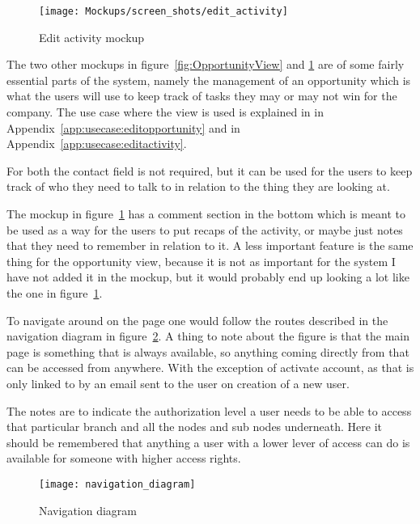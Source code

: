 \begin{figure}[!htb]
  \centering
  \texttt{[image: Mockups/screen\_shots/edit\_activity]}
  \caption{Edit activity mockup}
\label{fig:ActivityView}
\end{figure}

The two other mockups in figure~\ref{fig:OpportunityView} and
\ref{fig:ActivityView} are of some fairly essential parts of the system, namely
the management of an opportunity which is what the users will use to keep track
of tasks they may or may not win for the company. The use case where the view is
used is explained in  in
Appendix~\ref{app:usecase:editopportunity} and
 in Appendix~\ref{app:usecase:editactivity}.


For both the contact field is not required, but it can be used for the users to
keep track of who they need to talk to in relation to the thing they are looking
at. 

The mockup in figure~\ref{fig:ActivityView} has a comment section in the bottom
which is meant to be used as a way for the users to put recaps of the activity,
or maybe just notes that they need to remember in relation to it. A less
important feature is the same thing for the opportunity view, because it is not
as important for the system I have not added it in the mockup, but it would
probably end up looking a lot like the one in figure~\ref{fig:ActivityView}. 

To navigate around on the page one would follow the routes described in the
navigation diagram in figure~\ref{fig:navigation_diagram}. A thing to note about
the figure is that the main page is something that is always available, so
anything coming directly from that can be accessed from anywhere. With the
exception of activate account, as that is only linked to by an email sent to the
user on creation of a new user.

The notes are to indicate the authorization level a user needs to be able to
access that particular branch and all the nodes and sub nodes underneath. Here
it should be remembered that anything a user with a lower lever of access can do
is available for someone with higher access rights.

\begin{figure}[!htb]
  \centering
  \texttt{[image: navigation\_diagram]}
  \caption{Navigation diagram}
\label{fig:navigation_diagram}
\end{figure}

